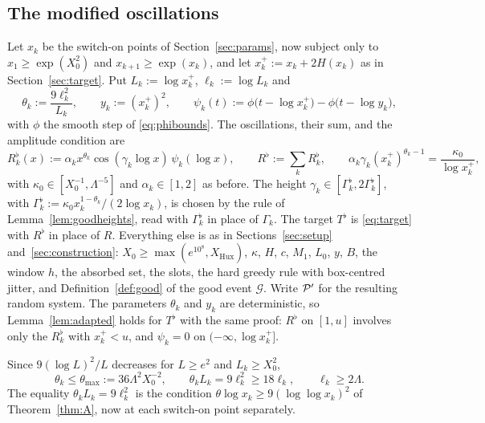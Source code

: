 \subsection{The modified oscillations}\label{sec:onezero-osc}
Let $x_k$ be the switch-on points of Section~\ref{sec:params}, now subject only to $x_1\ge\exp(X_0^2)$ and $x_{k+1}\ge\exp(x_k)$, and
let $x_k^+:=x_k+2H(x_k)$ as in Section~\ref{sec:target}. Put $L_k:=\log x_k^+$, $\ell_k:=\log L_k$ and
\begin{equation}\label{eq:thetak}
  \theta_k:=\frac{9\ell_k^2}{L_k},\qquad y_k:=(x_k^+)^2,\qquad \psi_k(t):=\phi\bigl(t-\log x_k^+\bigr)-\phi\bigl(t-\log y_k\bigr),
\end{equation}
with $\phi$ the smooth step of \eqref{eq:phibounds}. The oscillations, their sum, and the amplitude condition are
\begin{equation}\label{eq:Rkflat}
  R_k^\flat(x):=\alpha_kx^{\theta_k}\cos(\gamma_k\log x)\,\psi_k(\log x),\qquad R^\flat:=\sum_kR_k^\flat,\qquad
  \alpha_k\gamma_k(x_k^+)^{\theta_k-1}=\frac{\kappa_0}{\log x_k^+},
\end{equation}
with $\kappa_0\in[X_0^{-1},\Lambda^{-5}]$ and $\alpha_k\in[1,2]$ as before. The height $\gamma_k\in[\Gamma_k^\flat,2\Gamma_k^\flat]$, with
$\Gamma_k^\flat:=\kappa_0x_k^{1-\theta_k}/(2\log x_k)$, is chosen by the rule of Lemma~\ref{lem:goodheights}, read with $\Gamma_k^\flat$ in
place of $\Gamma_k$. The target $T^\flat$ is \eqref{eq:target} with $R^\flat$ in place of $R$. Everything else is as in
Sections~\ref{sec:setup} and~\ref{sec:construction}: $X_0\ge\max(e^{10^8},X_{\mathrm{Hux}})$, $\kappa$, $H$, $c$, $M_1$, $L_0$, $y$, $B$,
the window $h$, the absorbed set, the slots, the hard greedy rule with box-centred jitter, and Definition~\ref{def:good} of the good
event $\mathcal G$. Write $\mathcal{P}'$ for the resulting random system. The parameters $\theta_k$ and $y_k$ are deterministic, so
Lemma~\ref{lem:adapted} holds for $T^\flat$ with the same proof: $R^\flat$ on $[1,u]$ involves only the $R_k^\flat$ with $x_k^+<u$, and
$\psi_k=0$ on $(-\infty,\log x_k^+]$.

Since $9(\log L)^2/L$ decreases for $L\ge e^2$ and $L_k\ge X_0^2$,
\begin{equation}\label{eq:thetastar}
  \theta_k\le\theta_{\max}:=36\Lambda^2X_0^{-2},\qquad \theta_kL_k=9\ell_k^2\ge18\ell_k,\qquad \ell_k\ge2\Lambda .
\end{equation}
The equality $\theta_kL_k=9\ell_k^2$ is the condition $\theta\log x_k\ge9(\log\log x_k)^2$ of Theorem~\ref{thm:A}, now at each switch-on
point separately.

